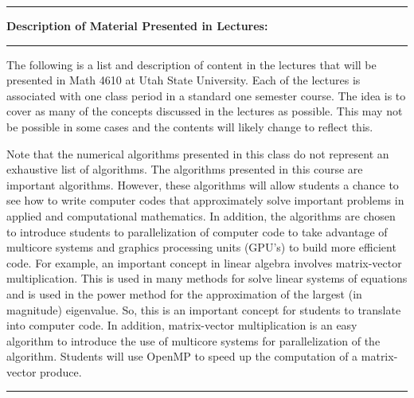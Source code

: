 \documentclass[10pt,fleqn]{article}
\begin{document}
\vskip0.1in\hrule\vskip0.1in
\noindent
{\bf Description of Material Presented in Lectures:}
\vskip0.1in\hrule\vskip0.1in
\noindent
The following is a list and description of content in the lectures that will be
presented in Math 4610 at Utah State University. Each of the lectures is
associated with one class period in a standard one semester course. The idea is
to cover as many of the concepts discussed in the lectures as possible. This may
not be possible in some cases and the contents will likely change to reflect
this.

\vskip0.1in
\noindent
Note that the numerical algorithms presented in this class do not represent an
exhaustive list of algorithms. The algorithms presented in this course are
important algorithms. However, these algorithms will allow students a chance to
see how to write computer codes that approximately solve important problems in
applied and computational mathematics. In addition, the algorithms are chosen to
introduce students to parallelization of computer code to take advantage of
multicore systems and graphics processing units (GPU's) to build more efficient
code. For example, an important concept in linear algebra involves matrix-vector
multiplication. This is used in many methods for solve linear systems of
equations and is used in the power method for the approximation of the largest
(in magnitude) eigenvalue. So, this is an important concept for students to
translate into computer code. In addition, matrix-vector multiplication is an
easy algorithm to introduce the use of multicore systems for parallelization of
the algorithm. Students will use OpenMP to speed up the computation of a
matrix-vector produce.
\vskip0.1in\hrule\vskip0.1in
\noindent
\end{document}
